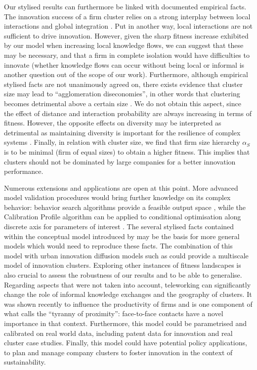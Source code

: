 \documentclass[letterpaper]{article}
\begin{document}
Our stylised results can furthermore be linked with documented empirical facts. The innovation success of a firm cluster relies on a strong interplay between local interactions and global integration \citep{fitjar2014local}. Put in another way, local interactions are not sufficient to drive innovation. However, given the sharp fitness increase exhibited by our model when increasing local knowledge flows, we can suggest that these may be necessary, and that a firm in complete isolation would have difficulties to innovate (whether knowledge flows can occur without being local or informal is another question out of the scope of our work). Furthermore, although empirical stylised facts are not unanimously agreed on, there exists evidence that cluster size may lead to ``agglomeration diseconomies'', in other words that clustering becomes detrimental above a certain size \citep{folta2006geographic}. We do not obtain this aspect, since the effect of distance and interaction probability are always increasing in terms of fitness. However, the opposite effects on diversity may be interpreted as detrimental as maintaining diversity is important for the resilience of complex systems \citep{fraccascia2018resilience}. Finally, in relation with cluster size, we find that firm size hierarchy $\alpha_S$ is to be minimal (firm of equal sizes) to obtain a higher fitness. This implies that clusters should not be dominated by large companies for a better innovation performance.

Numerous extensions and applications are open at this point. More advanced model validation procedures would bring further knowledge on its complex behavior: behavior search algorithms provide a feasible output space \citep{cherel2015beyond}, while the Calibration Profile algorithm can be applied to conditional optimisation along discrete axis for parameters of interest \citep{reuillon2015new}. The several stylised facts contained within the conceptual model introduced by \cite{gnyawali2013complementary} may be the basis for more general models which would need to reproduce these facts. The combination of this model with urban innovation diffusion models such as \citep{raimbault2020model} could provide a multiscale model of innovation clusters. Exploring other instances of fitness landscapes is also crucial to assess the robustness of our results and to be able to generalise. Regarding aspects that were not taken into account, teleworking can significantly change the role of informal knowledge exchanges and the geography of clusters. It was shown recently to influence the productivity of firms \citep{bergeaud4015066telework} and is one component of what \cite{duranton1999distance} calls the ``tyranny of proximity'': face-to-face contacts have a novel importance in that context. Furthermore, this model could be parametrised and calibrated on real world data, including patent data for innovation and real cluster case studies. Finally, this model could have potential policy applications, to plan and manage company clusters to foster innovation in the context of sustainability.
\end{document}
